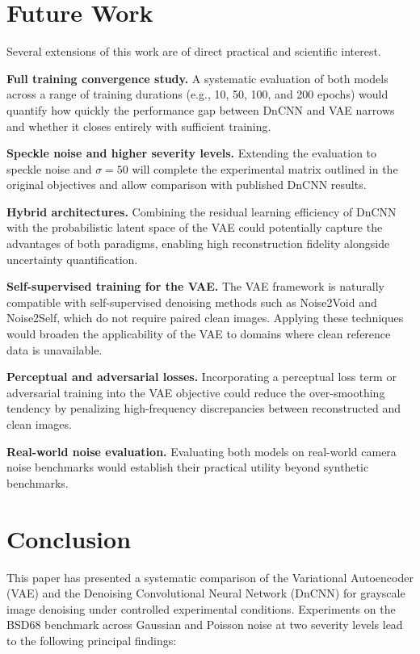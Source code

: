\documentclass[conference]{IEEEtran}
\begin{document}
\section{Future Work}

Several extensions of this work are of direct practical and scientific
interest.

\textbf{Full training convergence study.} A systematic evaluation of
both models across a range of training durations (e.g., 10, 50, 100, and
200 epochs) would quantify how quickly the performance gap between DnCNN
and VAE narrows and whether it closes entirely with sufficient training.

\textbf{Speckle noise and higher severity levels.} Extending the
evaluation to speckle noise and \(\sigma = 50\) will complete the
experimental matrix outlined in the original objectives and allow
comparison with published DnCNN results.

\textbf{Hybrid architectures.} Combining the residual learning efficiency
of DnCNN \cite{he2016deep} with the probabilistic latent space of the
VAE \cite{kingma2014vae} could potentially capture the advantages of both
paradigms, enabling high reconstruction fidelity alongside uncertainty
quantification.

\textbf{Self-supervised training for the VAE.} The VAE framework is
naturally compatible with self-supervised denoising methods such as
Noise2Void and Noise2Self, which do not require paired clean images.
Applying these techniques would broaden the applicability of the VAE to
domains where clean reference data is unavailable.

\textbf{Perceptual and adversarial losses.} Incorporating a perceptual
loss term \cite{zhang2018lpips} or adversarial training into the VAE
objective could reduce the over-smoothing tendency by penalizing
high-frequency discrepancies between reconstructed and clean images.

\textbf{Real-world noise evaluation.} Evaluating both models on
real-world camera noise benchmarks would establish their practical utility
beyond synthetic benchmarks.

\section{Conclusion}

This paper has presented a systematic comparison of the Variational
Autoencoder (VAE) and the Denoising Convolutional Neural Network (DnCNN)
for grayscale image denoising under controlled experimental conditions.
Experiments on the BSD68 benchmark across Gaussian and Poisson noise at
two severity levels lead to the following principal findings:
\end{document}
